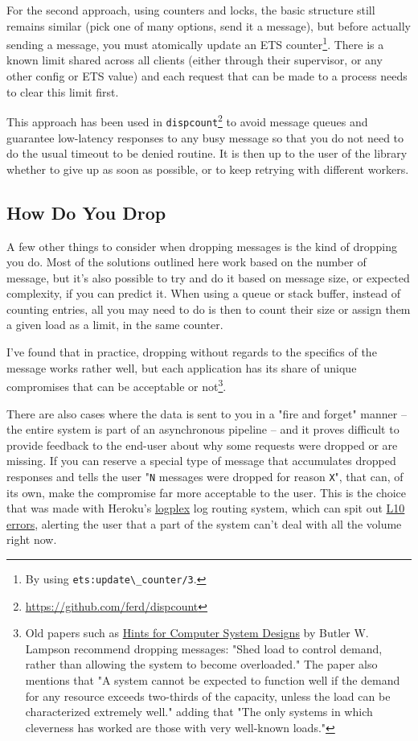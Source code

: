 \documentclass[11pt, oneside]{book}   	%
\newcommand{\module}[1]{\Verb`#1`}
\newcommand{\function}[1]{\Verb`#1`}
\newcommand{\var}[1]{\Verb`#1`}
\begin{document}
For the second approach, using counters and locks, the basic structure still remains similar (pick one of many options, send it a message), but before actually sending a message, you must atomically update an ETS counter\footnote{By using \function{ets:update\_counter/3}.}. There is a known limit shared across all clients (either through their supervisor, or any other config or ETS value) and each request that can be made to a process needs to clear this limit first.

This approach has been used in \module{dispcount}\footnote{\href{https://github.com/ferd/dispcount}{https://github.com/ferd/dispcount}} to avoid message queues and guarantee low-latency responses to any busy message so that you do not need to do the usual timeout to be denied routine. It is then up to the user of the library whether to give up as soon as possible, or to keep retrying with different workers.

\subsection{How Do You Drop}

A few other things to consider when dropping messages is the kind of dropping you do. Most of the solutions outlined here work based on the number of message, but it's also possible to try and do it based on message size, or expected complexity, if you can predict it. When using a queue or stack buffer, instead of counting entries, all you may need to do is then to count their size or assign them a given load as a limit, in the same counter.

I've found that in practice, dropping without regards to the specifics of the message works rather well, but each application has its share of unique compromises that can be acceptable or not\footnote{Old papers such as \href{http://research.microsoft.com/en-us/um/people/blampson/33-hints/webpage.html}{Hints for Computer System Designs} by Butler W. Lampson recommend dropping messages: "Shed load to control demand, rather than allowing the system to become overloaded." The paper also mentions that  "A system cannot be expected to function well if the demand for any resource exceeds two-thirds of the capacity, unless the load can be characterized extremely well." adding that "The only systems in which cleverness has worked are those with very well-known loads."}.

There are also cases where the data is sent to you in a "fire and forget" manner -- the entire system is part of an asynchronous pipeline -- and it proves difficult to provide feedback to the end-user about why some requests were dropped or are missing. If you can reserve a special type of message that accumulates dropped responses and tells the user "\var{N} messages were dropped for reason \var{X}", that can, of its own, make the compromise far more acceptable to the user. This is the choice that was made with Heroku's \href{https://devcenter.heroku.com/articles/logplex}{logplex} log routing system, which can spit out \href{https://devcenter.heroku.com/articles/error-codes\#l10-drain-buffer-overflow}{L10 errors}, alerting the user that a part of the system can't deal with all the volume right now.
\end{document}
